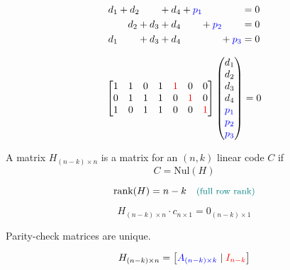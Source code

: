 \begin{frame}{}
  \begin{gather*}
	d_1 + d_2  \qquad + d_4 + \textcolor{blue}{p_1} \qquad\qquad = 0 \\
	\qquad d_2 + d_3 + d_4 \qquad + \textcolor{blue}{p_2} \qquad = 0 \\
	d_1 \qquad + d_3 + d_4 \qquad \qquad + \textcolor{blue}{p_3} = 0 \\
  \end{gather*}

  \pause
  \[
	\begin{bmatrix}
	  1 & 1 & 0 & 1 & \textcolor{red}{1} & 0 & 0 \\
	  0 & 1 & 1 & 1 & 0 & \textcolor{red}{1} & 0 \\
	  1 & 0 & 1 & 1 & 0 & 0 & \textcolor{red}{1} \\
	\end{bmatrix} \begin{pmatrix}
	  d_1 \\ d_2 \\ d_3 \\ d_4 \\ \textcolor{blue}{p_1} \\ \textcolor{blue}{p_2} \\ \textcolor{blue}{p_3}
	\end{pmatrix}
	= 0
  \]
\end{frame}

\begin{frame}{}
  \begin{definition}
	A matrix $H_{(n - k) \times n}$ is a  matrix for an $(n,k)$ linear code $C$ if
	\[
	  C = \text{Nul}(H)
	\]
  \end{definition}

  \pause
  \[
	\text{rank}(H) = n - k \quad \text{\textcolor{teal}{\small (full row rank)}}
  \]
  \begin{center}
  \end{center}

  \pause
  \[
	H_{(n - k) \times n} \cdot c_{n \times 1} = 0_{(n - k) \times 1}
  \]
\end{frame}

\begin{frame}
  \begin{exampleblock}{}
	Parity-check matrices are  unique.
  \end{exampleblock}

  \begin{center}
  \end{center}

  \pause
  \begin{definition}
	\[
	  H_{(n-k) \times n} = \begin{bmatrix}
		\textcolor{blue}{A_{(n-k) \times k}} \mid \textcolor{red}{I_{n-k}}
	  \end{bmatrix}
	\]
  \end{definition}
\end{frame}

